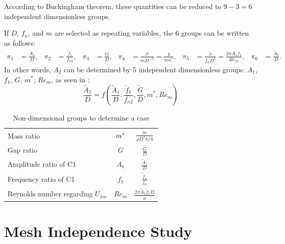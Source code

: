 According to Buckingham theorem, these quantities can be reduced to $ 9-3=6 $ independent dimensionless groups.

If $D$, $ f_{n}  $, and $m $ are selected as repeating variables, the 6 groups can be written as follows:
	\begin{align*}
	\pi_1&=\frac{\widetilde{A}_1}{D}, &
	\pi_2&=\frac{\widetilde{f}_1}{f_{n2}}, &
	\pi_3&=\frac{\widetilde{G}}{D}, & 	
	\pi_4&=\frac{\rho}{m D^{-2}}=\frac{4}{\pi m^*}, &
	\pi_5&=\frac{\widetilde{\nu}}{f_{n} D^2}=\frac{2 \pi {A}_1 {f}_1}{Re_m},&
	\pi_6&=\frac{\widetilde{A}_2}{D}.
	\end{align*}
In other words, $ A_2 $ can be determined by 5 independent dimensionless groups: $ A_1 $, $f_1 $, $ G $, $ m^* $, $ Re_m $, as seen in :
\begin{equation}\label{equ:nondim}
\frac{\widetilde{A}_2}{D}=f(\frac{\widetilde{A}_1}{D}, \frac{\widetilde{f}_1}{f_{n2}}, \frac{\widetilde{G}}{D},  m^*, Re_m)
\end{equation}

\bgroup
\def\arraystretch{2.2}%
\begin{table}[thb]
	\caption{Non-dimensional groups to determine a case}
	\centering
	\label{tablecasegroups}
	\begin{tabular}{l c c }
		\toprule
		Mass ratio & $m^*$ & {\Large $ \frac{m}{\rho D^2 \pi /4} $}  \\
		
		Gap ratio  & $  G $ &{\Large $ \frac{\widetilde{G}}{D} $}\\
		
		Amplitude ratio of C1 & $ A_1 $ &{\Large $ \frac{\widetilde{A}_1}{D} $  }\\
		
		Frequency ratio of C1  & $f_1$ &{\Large  $ \frac{\widetilde{f}_1}{f_n} $}\\
		
		Reynolds number regarding $ U_{1m} $ & $ Re_m $ &{\Large $ \frac{ 2\pi \widetilde{A}_1 \widetilde{f}_1 D}{\nu} $}\\
		\bottomrule
	\end{tabular}
\end{table}
\egroup

\section{Mesh Independence Study} \label{sec mesh indep}

